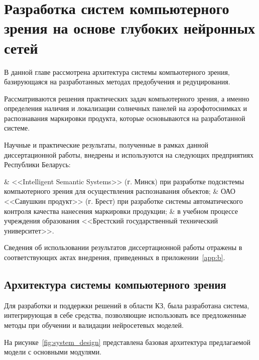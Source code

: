 \chapter{Разработка систем компьютерного зрения на основе глубоких нейронных сетей}
\label{chapter4}
В данной главе рассмотрена архитектура системы компьютерного зрения, базирующаяся на разработанных методах предобучения и редуцирования. 

Рассматриваются решения практических задач компьютерного зрения, а именно определения наличия и локализации солнечных панелей на аэрофотоснимках и распознавания маркировки продукта, которые основываются на разработанной системе.

Научные и практические результаты, полученные в рамках данной диссертационной работы, внедрены и используются на следующих предприятиях Республики Беларусь:

\begin{easylist}
	& <<Intelligent Semantic Systems>> (г. Минск) при разработке подсистемы компьютерного зрения для осуществления распознавания объектов;
	& ОАО <<Савушкин продукт>> (г. Брест) при разработке системы автоматического контроля качества нанесения маркировки продукции;
	& в учебном процессе учреждения образования <<Брестский государственный технический университет>>.
 \end{easylist}

Сведения об использовании результатов диссертационной работы отражены в соответствующих актах внедрения, приведенных в приложении~\ref{app:b}.

\section{Архитектура системы компьютерного зрения}
Для разработки и поддержки решений в области КЗ, была разработана система, интегрирующая в себе средства, позволяющие использовать все предложенные методы при обучении и валидации нейросетевых моделей.

На рисунке~\ref{fig:system_design} представлена базовая архитектура предлагаемой модели с основными модулями.

